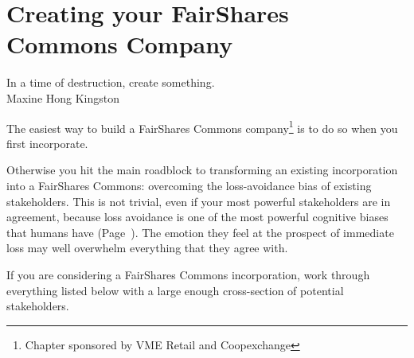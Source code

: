 ﻿\chapter{Creating your FairShares Commons Company}
\label{chapter:create-your-FSC}


\begin{chapterquotation}
In a time of destruction, create something.\\
\raggedleft\textemdash Maxine Hong Kingston
\end{chapterquotation}




The easiest way to build a FairShares Commons company\footnote{Chapter sponsored by VME Retail and Coopexchange}  is to do so when you first incorporate. 


Otherwise you hit the main roadblock to transforming an existing incorporation into a FairShares Commons: overcoming the loss-avoidance bias of existing stakeholders. 
This is not trivial, even if your most powerful stakeholders are in agreement, because loss avoidance is one of the most powerful cognitive biases that humans have (Page~\pageref{section:reward-loss}). The emotion they feel at the prospect of immediate loss may well overwhelm everything that they agree with.


If you are considering a FairShares Commons incorporation, work through everything listed below with a large enough cross-section of potential stakeholders.


